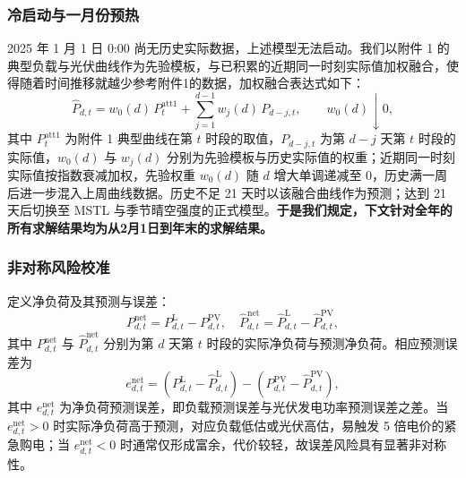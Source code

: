\documentclass[withoutpreface,bwprint]{cumcmthesis}
\begin{document}
\vspace*{-8pt}
\subsubsection{冷启动与一月份预热}

2025 年 1 月 1 日 0:00 尚无历史实际数据，上述模型无法启动。我们以附件 1 的典型负载与光伏曲线作为先验模板，与已积累的近期同一时刻实际值加权融合，使得随着时间推移就越少参考附件1的数据，加权融合表达式如下：
\vspace*{-5pt}
\begin{equation}
	\hat P_{d,t}=w_0(d)\,P^{\mathrm{att1}}_{t}+\sum_{j=1}^{d-1}w_j(d)\,P_{d-j,t},\qquad w_0(d)\downarrow 0,
	\label{eq:q2cold}
\end{equation}
\vspace*{-5pt}
其中 $P^{\mathrm{att1}}_t$ 为附件 1 典型曲线在第 $t$ 时段的取值，$P_{d-j,t}$ 为第 $d-j$ 天第 $t$ 时段的实际值，$w_0(d)$ 与 $w_j(d)$ 分别为先验模板与历史实际值的权重；近期同一时刻实际值按指数衰减加权，先验权重 $w_0(d)$ 随 $d$ 增大单调递减至 0，历史满一周后进一步混入上周曲线数据。历史不足 21 天时以该融合曲线作为预测；达到 21 天后切换至 MSTL 与季节晴空强度的正式模型。\textbf{于是我们规定，下文针对全年的所有求解结果均为从2月1日到年末的求解结果。}

\vspace*{-15pt}
\subsubsection{非对称风险校准}

定义净负荷及其预测与误差：
\vspace*{-5pt}
\begin{equation}
	P^{\mathrm{net}}_{d,t}=P^{\mathrm{L}}_{d,t}-P^{\mathrm{PV}}_{d,t},\quad
	\hat P^{\mathrm{net}}_{d,t}=\hat P^{\mathrm{L}}_{d,t}-\hat P^{\mathrm{PV}}_{d,t},
	\label{eq:q2net}
\end{equation}
\vspace*{-5pt}
其中 $P^{\mathrm{net}}_{d,t}$ 与 $\hat P^{\mathrm{net}}_{d,t}$ 分别为第 $d$ 天第 $t$ 时段的实际净负荷与预测净负荷。相应预测误差为
\vspace*{-5pt}
\begin{equation}
	e^{\mathrm{net}}_{d,t}=\left(P^{\mathrm{L}}_{d,t}-\hat P^{\mathrm{L}}_{d,t}\right)-\left(P^{\mathrm{PV}}_{d,t}-\hat P^{\mathrm{PV}}_{d,t}\right),
	\label{eq:q2enet}
\end{equation}
\vspace*{-5pt}
其中 $e^{\mathrm{net}}_{d,t}$ 为净负荷预测误差，即负载预测误差与光伏发电功率预测误差之差。当 $e^{\mathrm{net}}_{d,t}>0$ 时实际净负荷高于预测，对应负载低估或光伏高估，易触发 5 倍电价的紧急购电；当 $e^{\mathrm{net}}_{d,t}<0$ 时通常仅形成富余，代价较轻，故误差风险具有显著非对称性。
\end{document}
